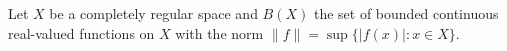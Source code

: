 Let $X$ be a completely regular space and $B(X)$ the set of bounded continuous real-valued functions on $X$ with the norm $\|f\| = \sup \{|f(x)| : x \in X\}$.
